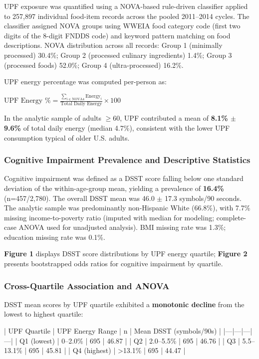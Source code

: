 \documentclass[journal,twoside,10pt]{IEEEtran}
\begin{document}
UPF exposure was quantified using a NOVA-based rule-driven classifier applied to 257,897 individual food-item records across the pooled 2011--2014 cycles. The classifier assigned NOVA groups using WWEIA food category code (first two digits of the 8-digit FNDDS code) and keyword pattern matching on food descriptions. NOVA distribution across all records: Group 1 (minimally processed) 30.4\%; Group 2 (processed culinary ingredients) 1.4\%; Group 3 (processed foods) 52.0\%; Group 4 (ultra-processed) 16.2\%.

UPF energy percentage was computed per-person as:

$\text{UPF Energy \%} = \frac{\sum_{i \in \text{NOVA4}} \text{Energy}_{i}}{\text{Total Daily Energy}} \times 100$

In the analytic sample of adults $\geq$60, UPF contributed a mean of \textbf{8.1\% $\pm$ 9.6\%} of total daily energy (median 4.7\%), consistent with the lower UPF consumption typical of older U.S. adults.

\subsubsection{Cognitive Impairment Prevalence and Descriptive Statistics}

Cognitive impairment was defined as a DSST score falling below one standard deviation of the within-age-group mean, yielding a prevalence of \textbf{16.4\%} (n=457/2,780). The overall DSST mean was 46.0 $\pm$ 17.3 symbols/90 seconds. The analytic sample was predominantly non-Hispanic White (66.8\%), with 7.7\% missing income-to-poverty ratio (imputed with median for modeling; complete-case ANOVA used for unadjusted analysis). BMI missing rate was 1.3\%; education missing rate was 0.1\%.

\textbf{Figure 1} displays DSST score distributions by UPF energy quartile; \textbf{Figure 2} presents bootstrapped odds ratios for cognitive impairment by quartile.

\subsubsection{Cross-Quartile Association and ANOVA}

DSST mean scores by UPF quartile exhibited a \textbf{monotonic decline} from the lowest to highest quartile:

| UPF Quartile | UPF Energy Range | n | Mean DSST (symbols/90s) |
|---|---|---|---|
| Q1 (lowest) | 0--2.0\% | 695 | 46.87 |
| Q2 | 2.0--5.5\% | 695 | 46.76 |
| Q3 | 5.5--13.1\% | 695 | 45.81 |
| Q4 (highest) | >13.1\% | 695 | 44.47 |
\end{document}
